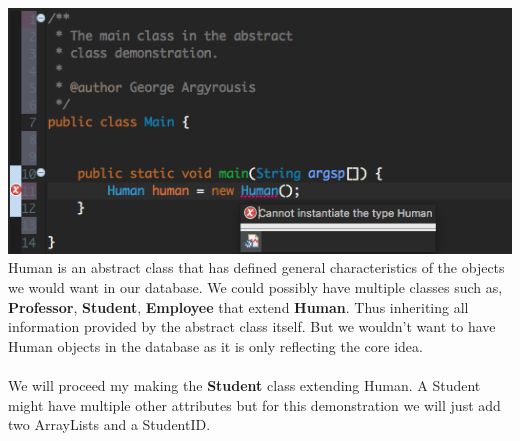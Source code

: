 \documentclass{article}
\begin{document}
            \includegraphics[scale=0.6]{images/Main_error.png}\\
Human is an abstract class that has defined general characteristics of the objects we would want in our database. We could possibly have multiple classes such as, \textbf{Professor}, \textbf{Student}, \textbf{Employee} that extend \textbf{Human}.
Thus inheriting all information provided by the abstract class itself. But we wouldn't want to have Human objects in the database as it is only reflecting the core idea.\\\\
We will proceed my making the \textbf{Student} class extending Human.
A Student might have multiple other attributes but for this demonstration we will just add two ArrayLists and a StudentID.
\end{document}

